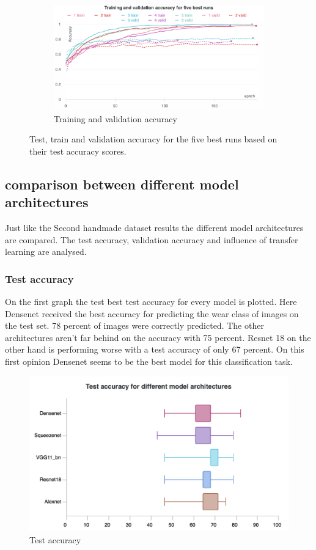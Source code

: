 \begin{figure}[hbtp]
\begin{subfigure}{0.49\textwidth}
		\end{subfigure}
		\hspace*{\fill}
		\centering
		\begin{subfigure}{0.6\textwidth}
			\centering
			\includegraphics[width=\linewidth]{fig/results/wandb/spaghetti_dataset/charts/train_valid_accuracy.png}
			\caption{Training and validation accuracy}
			\label{fig:res:sd:va}
		\end{subfigure}
		\caption{Test, train and validation accuracy for the five best runs based on their test accuracy scores.}
	\end{figure}
	
	\subsection{comparison between different model architectures}
		Just like the Second handmade dataset results the different model architectures are compared. The test accuracy, validation accuracy and influence of transfer learning are analysed.
		\subsubsection{Test accuracy}
			On the first graph the test best test accuracy for every model is plotted. Here Densenet received the best accuracy for predicting the wear class of images on the test set. 78 percent of images were correctly predicted. The other architectures aren't far behind on the accuracy with 75 percent. Resnet 18 on the other hand is performing worse with a test accuracy of only 67 percent. On this first opinion Densenet seems to be the best model for this classification task.

	\begin{figure}[hbtp]
		\centering
		\includegraphics[width=0.5\linewidth]{fig/results/wandb/spaghetti_dataset/charts/Section-6-Panel-0-5bt9qjs32}
		\caption{Test accuracy}
	\end{figure}
	
